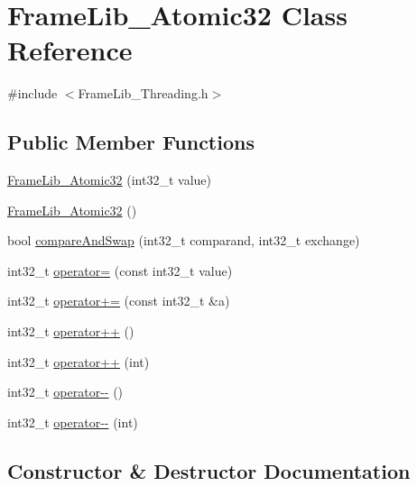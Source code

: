 \hypertarget{class_frame_lib___atomic32}{}\section{Frame\+Lib\+\_\+\+Atomic32 Class Reference}
\label{class_frame_lib___atomic32}


{\ttfamily \#include $<$Frame\+Lib\+\_\+\+Threading.\+h$>$}

\subsection*{Public Member Functions}
\begin{DoxyCompactItemize}
\item 
\hyperlink{class_frame_lib___atomic32_ab200aaee62212517202f4ce930dee1d8}{Frame\+Lib\+\_\+\+Atomic32} (int32\+\_\+t value)
\item 
\hyperlink{class_frame_lib___atomic32_a6792ab371c313c18fa937e4c1f5d3ad6}{Frame\+Lib\+\_\+\+Atomic32} ()
\item 
bool \hyperlink{class_frame_lib___atomic32_aa3bc4a8674998a79479480fb9993e767}{compare\+And\+Swap} (int32\+\_\+t comparand, int32\+\_\+t exchange)
\item 
int32\+\_\+t \hyperlink{class_frame_lib___atomic32_ac7565158777f53ff5e859f190b80648f}{operator=} (const int32\+\_\+t value)
\item 
int32\+\_\+t \hyperlink{class_frame_lib___atomic32_ab41cfcc652ed307755c41af7b30562e9}{operator+=} (const int32\+\_\+t \&a)
\item 
int32\+\_\+t \hyperlink{class_frame_lib___atomic32_a7da4bebfda8f03dd478fb7917824ebb5}{operator++} ()
\item 
int32\+\_\+t \hyperlink{class_frame_lib___atomic32_a3271b69df5d46660469038c2fac4ac4e}{operator++} (int)
\item 
int32\+\_\+t \hyperlink{class_frame_lib___atomic32_aebb48565023d6cefbaa9bacd797dd9e2}{operator-\/-\/} ()
\item 
int32\+\_\+t \hyperlink{class_frame_lib___atomic32_af3cc1d2db25b8e693d2250f7fcd78abc}{operator-\/-\/} (int)
\end{DoxyCompactItemize}


\subsection{Constructor \& Destructor Documentation}
\mbox{\label{class_frame_lib___atomic32_ab200aaee62212517202f4ce930dee1d8}} 
